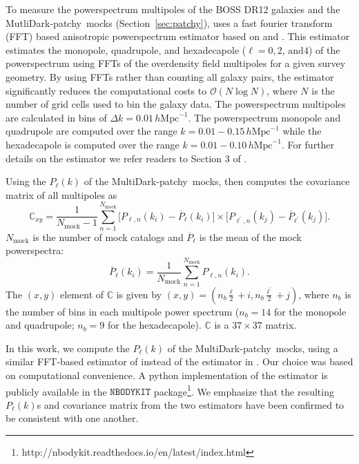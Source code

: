 \documentclass[12pt, letterpaper, preprint]{aastex}
\newcommand{\beq}{\begin{equation}}
\newcommand{\eeq}{\end{equation}}
\newcommand{\patchy}{{\fontshape\scdefault\selectfont patchy}}
\begin{document}
To measure the powerspectrum multipoles of the BOSS DR12 galaxies
and the MutliDark-\patchy~mocks (Section~\ref{sec:patchy}), \cite{beutler2017} uses a 
fast fourier transform (FFT) based anisotropic powerspectrum estimator 
based on \cite{bianchi2015} and \cite{scoccimarro2015a}. This estimator 
estimates the  monopole, quadrupole, and hexadecapole 
($\ell = 0, 2,\,\mathrm{and} 4$) of the powerspectrum using FFTs of the 
overdensity field multipoles for a given survey geometry. By using FFTs
rather than counting all galaxy pairs, the estimator significantly 
reduces the computational costs to $\mathcal{O}(N \log N)$, where
$N$ is the number of grid cells used to bin the galaxy data. 
The powerspectrum multipoles are calculated in bins of 
$\Delta k = 0.01\, h\mathrm{Mpc}^{-1}$. 
The powerspectrum monopole and quadrupole are computed over
the range $k = 0.01 - 0.15\, h\mathrm{Mpc}^{-1}$ while the 
hexadecapole is computed over the range $k = 0.01 - 0.10\, h\mathrm{Mpc}^{-1}$.
For further details on the estimator we refer readers to Section 3 of 
\cite{beutler2017}. 

Using the $P_\ell(k)$ of the MultiDark-\patchy~mocks, \cite{beutler2017}
then computes the covariance matrix of all multipoles as 
\beq
\mathbb{C}_{xy} = \frac{1}{N_\mathrm{mock} - 1} \sum\limits_{n=1}^{N_\mathrm{mock}} \big[ P_{\ell,n}(k_i) - \overline{P}_\ell(k_i) \big]
    \times \big[ P_{\ell^{'},n}(k_j) - \overline{P}_{\ell^{'}}(k_j) \big].
\eeq
$N_\mathrm{mock}$ is the number of mock catalogs and $\overline{P}_\ell$ is
the mean of the mock powerspectra: 
\beq
\overline{P}_\ell(k_i) = \frac{1}{N_\mathrm{mock}} \sum\limits_{n=1}^{N_\mathrm{mock}} P_{\ell, n}(k_i). 
\eeq
The $(x,y)$ element of $\mathbb{C}$ is given by 
$(x,y) = (n_b\frac{\ell}{2} + i, n_b\frac{\ell^{'}}{2} + j)$, where 
$n_b$ is the number of bins in each multipole power spectrum ($n_b = 14$ for the 
monopole and quadrupole; $n_b = 9$ for the hexadecapole). $\mathbb{C}$ is a $37 \times 37$ 
matrix. 

In this work, we compute the $P_\ell(k)$ of the MultiDark-\patchy~mocks, 
using a similar FFT-based estimator of \cite{hand2017a} instead
of the estimator in \cite{beutler2017}. Our choice was based on 
computational convenience. A python implementation
of the \cite{hand2017a} estimator is publicly available in the $\mathtt{NBODYKIT}$ 
package\footnote{http://nbodykit.readthedocs.io/en/latest/index.html}. 
We emphasize that the resulting $P_\ell(k)$s and covariance matrix from 
the two estimators have been confirmed to be consistent with one another. 
\end{document}
